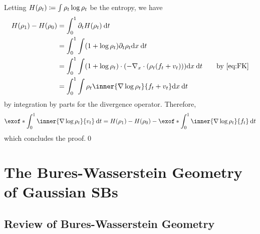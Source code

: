 Letting $H(\rho_{t}) \coloneqq \int \rho_{t}\log\rho_{t}$ be the entropy, we have
\begin{align*}
H(\measure[\horizon]) - H(\measure[0]) &= \int_0^\horizon \del_t H(\measure) \dt \\
&= \int_0^\horizon  \int   (1+ \log\measure) \del_t\measure \drm \point \dt  \\
&= \int_0^\horizon  \int   (1+ \log\measure) \cdot \parens*{ - \Div \parens*{ \measure(\driftf+\vect) }  } \drm \point \dt  \quad\quad \text{by \eqref{eq:FK}}\\
&= \int_0^\horizon  \int   \measure \inner{\nabla\log\measure}{ \driftf+\vect} \drm \point \dt 
\end{align*}
by integration by parts for the divergence operator. Therefore,
\begin{align}
\exof*{\int_0^\horizon  \inner{\nabla\log\measure}{ \vect}  \dt } = H(\measure[\horizon]) - H(\measure[0])-\exof*{\int_0^\horizon  \inner{\nabla\log\measure}{ \driftf}  \dt }
\end{align} 
which concludes the proof.\qed



\section{The Bures-Wasserstein Geometry of Gaussian SBs}
\label{app:mechanics}

\subsection{Review of Bures-Wasserstein Geometry}

\label{app:reviewBW}

